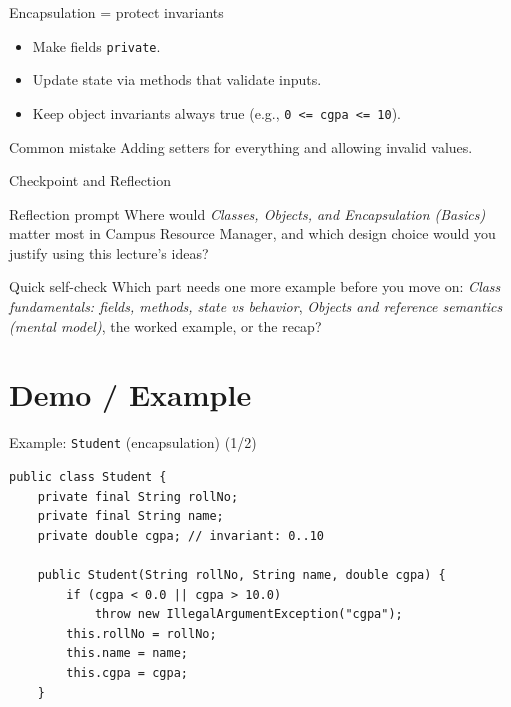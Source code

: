 \documentclass{beamer}
\begin{document}
\begin{frame}{Encapsulation = protect invariants}
  \begin{itemize}[<+->]
    \item Make fields \texttt{private}.
    \item Update state via methods that validate inputs.
    \item Keep object invariants always true (e.g., \texttt{0 <= cgpa <= 10}).
  \end{itemize}
  \begin{block}{Common mistake}
    Adding setters for everything and allowing invalid values.
  \end{block}
  \slidesources{\OOPSUnitIISources}
\end{frame}

\begin{frame}{Checkpoint and Reflection}
\begin{block}{Reflection prompt}
Where would \textit{Classes, Objects, and Encapsulation (Basics)} matter most in Campus Resource Manager, and which design choice would you justify using this lecture's ideas?
\end{block}
\begin{block}{Quick self-check}
Which part needs one more example before you move on: \textit{Class fundamentals: fields, methods, state vs behavior}, \textit{Objects and reference semantics (mental model)}, the worked example, or the recap?
\end{block}
  \slidesources{\OOPSUnitIISources}
\end{frame}

\section{Demo / Example}
\label{sec:demo}

\begin{frame}[fragile,shrink=8]{Example: \texttt{Student} (encapsulation) (1/2)}
\begin{lstlisting}
public class Student {
    private final String rollNo;
    private final String name;
    private double cgpa; // invariant: 0..10

    public Student(String rollNo, String name, double cgpa) {
        if (cgpa < 0.0 || cgpa > 10.0)
            throw new IllegalArgumentException("cgpa");
        this.rollNo = rollNo;
        this.name = name;
        this.cgpa = cgpa;
    }
\end{lstlisting}
  \slidesources{\OOPSUnitIISources}
\end{frame}
\end{document}
